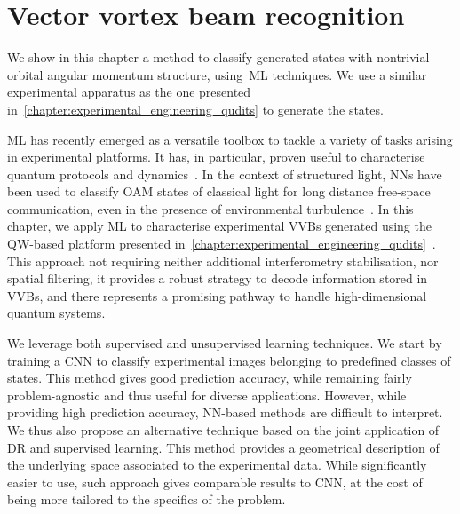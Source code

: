 
\chapter{Vector vortex beam recognition}
\label{chapter:ML_VVBs}

We show in this chapter a method to classify generated states with nontrivial orbital angular momentum structure, using~\acf{ML} techniques. We use a similar experimental apparatus as the one presented in~\cref{chapter:experimental_engineering_qudits} to generate the states.

\acf{ML} has recently emerged as a versatile toolbox to tackle a variety of tasks arising in experimental platforms. It has, in particular, proven useful to characterise quantum protocols and dynamics~\cite{carrasquilla2019reconstructing,giordani2018experimental, agresti2019pattern,lumino2018experimental,rocchetto2019experimental,butler2018machine,fischer2006predicting,melnikov2018active,wang2017experimental}.
In the context of structured light, \acfp{NN} have been used to classify \ac{OAM} states of classical light for long distance free-space communication, even in the presence of environmental turbulence~\cite{krenn2014communication,krenn2016twisted,doster2017machine,park2018demultiplexing,lohani2018turbulence,li2018joint}.
In this chapter, we apply \ac{ML} to characterise experimental \acfp{VVB} generated using the \ac{QW}-based platform presented in~\cref{chapter:experimental_engineering_qudits}~\cite{innocenti2017quantum,giordani2019experimental}.
This approach not requiring neither additional interferometry stabilisation, nor spatial filtering, it provides a robust strategy to decode information stored in \acp{VVB}, and there represents a promising pathway to handle high-dimensional quantum systems. 

We leverage both supervised and unsupervised learning techniques. We start by training a \ac{CNN} to classify experimental images belonging to predefined classes of states. This method gives good prediction accuracy, while remaining fairly problem-agnostic and thus useful for diverse applications. However, while providing high prediction accuracy, NN-based methods are difficult to interpret.
We thus also propose an alternative technique based on the joint application of \ac{DR} and supervised learning.
This method provides a geometrical description of the underlying space associated to the experimental data.
While significantly easier to use, such approach gives comparable results to CNN,
at the cost of being more tailored to the specifics of the problem.

